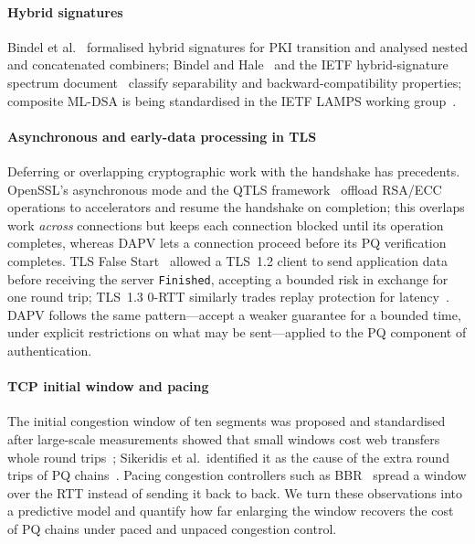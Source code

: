 \documentclass[preprint,10pt,3p]{elsarticle}
\begin{document}
\paragraph{Hybrid signatures}  Bindel et al.~\cite{Bindel2017}
formalised hybrid signatures for PKI transition and analysed nested and
concatenated combiners; Bindel and Hale~\cite{BindelHale2023} and the
IETF hybrid-signature spectrum document~\cite{HybridSpectrums} classify
separability and backward-compatibility properties; composite ML-DSA is
being standardised in the IETF LAMPS working group~\cite{CompositeSigs}.

\paragraph{Asynchronous and early-data processing in TLS}  Deferring or
overlapping cryptographic work with the handshake has precedents.  OpenSSL's
asynchronous mode and the QTLS framework~\cite{Hu2019QTLS} offload RSA/ECC
operations to accelerators and resume the handshake on completion; this
overlaps work \emph{across} connections but keeps each connection blocked
until its operation completes, whereas DAPV lets a connection proceed
before its PQ verification completes.  TLS False Start~\cite{RFC7918}
allowed a TLS~1.2 client to send application data before receiving the
server \texttt{Finished}, accepting a bounded risk in exchange for one
round trip; TLS~1.3 0-RTT similarly trades replay protection for
latency~\cite{RFC8446}.  DAPV follows the same pattern---accept a weaker
guarantee for a bounded time, under explicit restrictions on what may be
sent---applied to the PQ component of authentication.

\paragraph{TCP initial window and pacing}  The initial congestion window
of ten segments was proposed and standardised after large-scale
measurements showed that small windows cost web transfers whole round
trips~\cite{Dukkipati2010IW,RFC6928}; Sikeridis et al.\ identified it as
the cause of the extra round trips of PQ chains~\cite{Sikeridis2020a}.
Pacing congestion controllers such as BBR~\cite{Cardwell2016BBR} spread a
window over the RTT instead of sending it back to back.  We turn these
observations into a predictive model and quantify how far enlarging the
window recovers the cost of PQ chains under paced and unpaced congestion
control.
\end{document}
